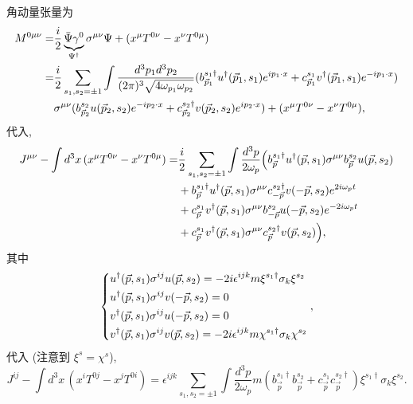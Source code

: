 \begin{itemize}
	\begin{tcolorbox}[title=calculation:]
		角动量张量为
		\begin{align}
			M^{0 \mu \nu} =& \frac{i}{2} \underbrace{\bar{\Psi} \gamma^0}_{\Psi^\dag} \sigma^{\mu \nu} \Psi + (x^\mu T^{0 \nu} - x^\nu T^{0 \mu}) \notag \\
			=& \frac{i}{2} \sum_{s_1, s_2 = \pm 1} \int \frac{d^3 p_1 d^3 p_2}{(2 \pi)^3 \sqrt{4 \omega_{p_1} \omega_{p_2}}} (b^{s_1 \dag}_{\vec{p}_1} u^\dag(\vec{p}_1, s_1) e^{i p_1 \cdot x} + c^{s_1}_{\vec{p}_1} v^\dag(\vec{p}_1, s_1) e^{- i p_1 \cdot x}) \notag \\
			& \sigma^{\mu \nu} (b^{s_2}_{\vec{p}_2} u(\vec{p}_2, s_2) e^{- i p_2 \cdot x} + c^{s_2 \dag}_{\vec{p}_2} v(\vec{p}_2, s_2) e^{i p_2 \cdot x}) + (x^\mu T^{0 \nu} - x^\nu T^{0 \mu}),
		\end{align}
		代入,
		\begin{align}
			J^{\mu \nu} - \int d^3 x \, (x^\mu T^{0 \nu} - x^\nu T^{0 \mu}) =& \frac{i}{2} \sum_{s_1, s_2 = \pm 1} \int \frac{d^3 p}{2 \omega_p} \Big( b^{s_1 \dag}_{\vec{p}} u^\dag(\vec{p}, s_1) \sigma^{\mu \nu} b^{s_2}_{\vec{p}} u(\vec{p}, s_2) \notag \\
			& + b^{s_1 \dag}_{\vec{p}} u^\dag(\vec{p}, s_1) \sigma^{\mu \nu} c^{s_2 \dag}_{- \vec{p}} v(- \vec{p}, s_2) e^{2 i \omega_p t} \notag \\
			& + c^{s_1}_{\vec{p}} v^\dag(\vec{p}, s_1) \sigma^{\mu \nu} b^{s_2}_{- \vec{p}} u(- \vec{p}, s_2) e^{- 2 i \omega_p t} \notag \\
			& + c^{s_1}_{\vec{p}} v^\dag(\vec{p}, s_1) \sigma^{\mu \nu} c^{s_2 \dag}_{\vec{p}} v(\vec{p}, s_2) \Big),
		\end{align}
		其中
		\begin{equation}
			\begin{dcases}
				u^\dag(\vec{p}, s_1) \sigma^{i j} u(\vec{p}, s_2) = - 2 i \epsilon^{i j k} m \xi^{s_1 \dag} \sigma_k \xi^{s_2} \\
				u^\dag(\vec{p}, s_1) \sigma^{i j} v(- \vec{p}, s_2) = 0 \\
				v^\dag(\vec{p}, s_1) \sigma^{i j} u(- \vec{p}, s_2) = 0 \\
				v^\dag(\vec{p}, s_1) \sigma^{i j} v(\vec{p}, s_2) = - 2 i \epsilon^{i j k} m \chi^{s_1 \dag} \sigma_k \chi^{s_2}
			\end{dcases},
		\end{equation}
		代入 (注意到 $\xi^s = \chi^s$),
		\begin{equation}
			J^{i j} - \int d^3 x \, (x^i T^{0 j} - x^j T^{0 i}) = \epsilon^{i j k} \sum_{s_1, s_2 = \pm 1} \int \frac{d^3 p}{2 \omega_p} m (b^{s_1 \dag}_{\vec{p}} b^{s_2}_{\vec{p}} + c^{s_1}_{\vec{p}} c^{s_2 \dag}_{\vec{p}}) \xi^{s_1 \dag} \sigma_k \xi^{s_2}.
		\end{equation}
	\end{tcolorbox}
\end{itemize}

